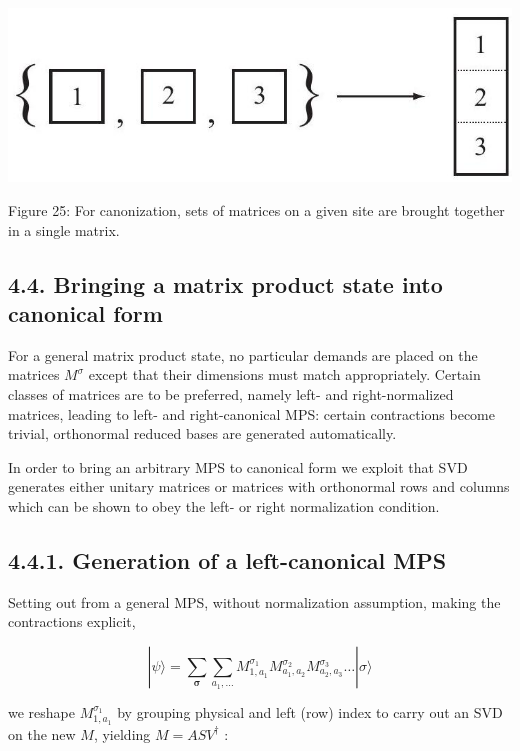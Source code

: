 \documentclass[12pt]{article}
\begin{document}
\begin{center}
\includegraphics[max width=\textwidth]{2024_05_04_afc4ad226da9ccfe0ac8g-043}
\end{center}

Figure 25: For canonization, sets of matrices on a given site are brought together in a single matrix.

\subsection*{4.4. Bringing a matrix product state into canonical form}
For a general matrix product state, no particular demands are placed on the matrices $M^{\sigma}$ except that their dimensions must match appropriately. Certain classes of matrices are to be preferred, namely left- and right-normalized matrices, leading to left- and right-canonical MPS: certain contractions become trivial, orthonormal reduced bases are generated automatically.

In order to bring an arbitrary MPS to canonical form we exploit that SVD generates either unitary matrices or matrices with orthonormal rows and columns which can be shown to obey the left- or right normalization condition.

\subsection*{4.4.1. Generation of a left-canonical MPS}
Setting out from a general MPS, without normalization assumption, making the contractions explicit,


\begin{equation*}
|\psi\rangle=\sum_{\boldsymbol{\sigma}} \sum_{a_{1}, \ldots} M_{1, a_{1}}^{\sigma_{1}} M_{a_{1}, a_{2}}^{\sigma_{2}} M_{a_{2}, a_{3}}^{\sigma_{3}} \ldots|\sigma\rangle \tag{135}
\end{equation*}


we reshape $M_{1, a_{1}}^{\sigma_{1}}$ by grouping physical and left (row) index to carry out an SVD on the new $M$, yielding $M=A S V^{\dagger}$ :
\end{document}
